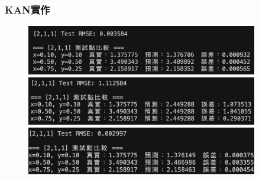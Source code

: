 \documentclass{beamer}
\begin{document}
\begin{frame}
    \frametitle{KAN實作}
    \begin{figure}
        \centering
        \begin{minipage}{\textwidth}
            \includegraphics[width=0.9\textwidth,height=0.4\textheight,keepaspectratio]{figures/211比較1.jpg}
            \centering          
        \end{minipage}
        
        \vspace{0.5em}
        
        \begin{minipage}{\textwidth}
            \includegraphics[width=0.9\textwidth,height=0.5\textheight,keepaspectratio]{figures/211比較6.jpg}
            \centering
        \end{minipage}

        \begin{minipage}{\textwidth}
            \includegraphics[width=0.9\textwidth,height=0.5\textheight,keepaspectratio]{figures/211比較12.jpg}
            \centering            
        \end{minipage}
    \end{figure}
\end{frame}
\end{document}
